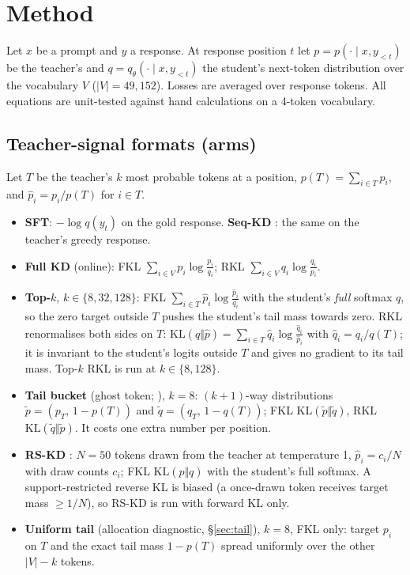 \documentclass[11pt]{article}
\newcommand{\KL}{\mathrm{KL}}
\begin{document}
\section{Method}\label{sec:method}

Let $x$ be a prompt and $y$ a response. At response position $t$ let $p=p(\cdot\mid x,y_{<t})$ be the teacher's and
$q=q_\theta(\cdot\mid x,y_{<t})$ the student's next-token distribution over the vocabulary $V$ ($|V|=49{,}152$).
Losses are averaged over response tokens. All equations are unit-tested against hand calculations on a 4-token
vocabulary.

\subsection{Teacher-signal formats (arms)}\label{sec:arms}
Let $T$ be the teacher's $k$ most probable tokens at a position, $p(T)=\sum_{i\in T}p_i$, and
$\hat p_i=p_i/p(T)$ for $i\in T$.
\begin{itemize}
\item \textbf{SFT}: $-\log q(y_t)$ on the gold response. \textbf{Seq-KD} \citep{kim2016seqkd}: the same on the
  teacher's greedy response.
\item \textbf{Full KD} (online): FKL $\sum_{i\in V}p_i\log\frac{p_i}{q_i}$; RKL $\sum_{i\in V}q_i\log\frac{q_i}{p_i}$.
\item \textbf{Top-$k$}, $k\in\{8,32,128\}$: FKL $\sum_{i\in T}\hat p_i\log\frac{\hat p_i}{q_i}$ with the student's
  \emph{full} softmax $q$, so the zero target outside $T$ pushes the student's tail mass towards zero. RKL
  renormalises both sides on $T$: $\KL(\hat q\Vert\hat p)=\sum_{i\in T}\hat q_i\log\frac{\hat q_i}{\hat p_i}$ with
  $\hat q_i=q_i/q(T)$; it is invariant to the student's logits outside $T$ and gives no gradient to its tail mass.
  Top-$k$ RKL is run at $k\in\{8,128\}$.
\item \textbf{Tail bucket} (ghost token; \citealp{anshumann2025sparse,dasgupta2026tad,huang2026taopd}), $k=8$:
  $(k{+}1)$-way distributions $\tilde p=(p_T,\,1-p(T))$ and $\tilde q=(q_T,\,1-q(T))$; FKL $\KL(\tilde p\Vert\tilde q)$,
  RKL $\KL(\tilde q\Vert\tilde p)$. It costs one extra number per position.
\item \textbf{RS-KD} \citep{anshumann2025sparse}: $N=50$ tokens drawn from the teacher at temperature 1,
  $\hat p_i=c_i/N$ with draw counts $c_i$; FKL $\KL(\hat p\Vert q)$ with the student's full softmax. A
  support-restricted reverse KL is biased (a once-drawn token receives target mass $\ge 1/N$), so RS-KD is run with
  forward KL only.
\item \textbf{Uniform tail} (allocation diagnostic, \S\ref{sec:tail}), $k=8$, FKL only: target $p_i$ on $T$ and the
  exact tail mass $1-p(T)$ spread uniformly over the other $|V|-k$ tokens.
\end{itemize}
\end{document}

